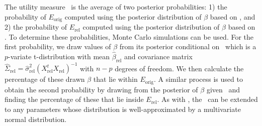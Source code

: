The utility measure \EO\ is the average of two posterior
probabilities: 1) the probability of $E_{\mathrm{orig}}$ computed
using the posterior distribution of $\beta$ based on \DBREL, and
2) the probability of $E_{\mathrm{rel}}$ computed using the
posterior distribution of $\beta$ based on \DBORIG. To determine
these probabilities,  Monte Carlo simulations can be used. For the first
probability, we draw values of $\beta$ from its posterior
conditional on \DBREL\ which is a $p$-variate t-distribution with
mean $\hat{\beta}_{\mathrm{rel}}$ and covariance matrix
$\hat{\Sigma}_{\mathrm{rel}} =
\hat{\sigma}^2_{\mathrm{rel}}(X_{\mathrm{rel}}^{t}X_{\mathrm{rel}})^{-1}$
with $n-p$ degrees of freedom. We then calculate the percentage of
these drawn $\beta$ that lie within $E_{\mathrm{orig}}$.  A
similar process is used to obtain the second probability by
drawing from the posterior of $\beta$ given \DBORIG\ and finding
the percentage of these that lie inside $E_{\mathrm{rel}}$. As
with \IO, the \EO\ can be extended to any parameters whose
distribution is well-approximated by a multivariate normal
distribution.